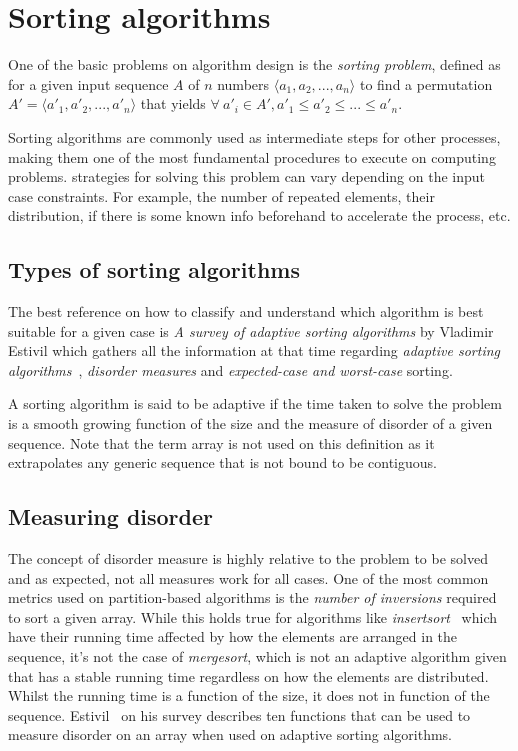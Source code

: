 \section{Sorting algorithms}
One of the basic problems on algorithm design is the \textit{sorting problem}, defined as for a given input sequence $A$ of $n$ numbers $\langle a_1, a_2,...,a_n \rangle$ to find a permutation $A' = \langle a'_1, a'_2,...,a'_n \rangle$ that yields $\forall~a'_i \in A', a'_1 \leq a'_2 \leq ... \leq a'_n $.

Sorting algorithms are commonly used as intermediate steps for other processes, making them one of the most fundamental procedures to execute on computing problems. strategies for solving this problem can vary depending on the input case constraints. For example, the number of repeated elements, their distribution, if there is some known info beforehand to accelerate the process, etc.

\subsection{Types of sorting algorithms}
The best reference on how to classify and understand which algorithm is best suitable for a given case is \textit{A survey of adaptive sorting algorithms} by Vladimir Estivil\cite{estivil92} which gathers all the information at that time regarding \textit{adaptive sorting algorithms}~\cite{Mehlhorn_1984}, \textit{disorder measures} and \textit{expected-case and worst-case} sorting.

A sorting algorithm is said to be adaptive if the time taken to solve the problem is a smooth growing function of the size and the measure of disorder of a given sequence. Note that the term array is not used on this definition as it extrapolates any generic sequence that is not bound to be contiguous.

\subsection{Measuring disorder}
\label{SEC:MEASURING_DISORDER}
The concept of disorder measure is highly relative to the problem to be solved and as expected, not all measures work for all cases. One of the most common metrics used on partition-based algorithms is the \textit{number of inversions} required to sort a given array. While this holds true for algorithms like \textit{insertsort}~\cite{10.5555/150918} which have their running time affected by how the elements are arranged in the sequence, it's not the case of \textit{mergesort}, which is not an adaptive algorithm given that has a stable running time regardless on how the elements are distributed. Whilst the running time is a function of the size, it does not in function of the sequence. Estivil~\cite{estivil92} on his survey describes ten functions that can be used to measure disorder on an array when used on adaptive sorting algorithms.

